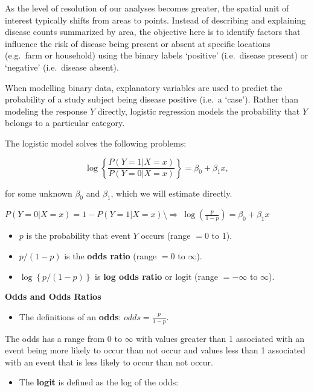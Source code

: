 \documentclass[]{book}
\providecommand{\tightlist}{%
  \setlength{\itemsep}{0pt}\setlength{\parskip}{0pt}}
\begin{document}
As the level of resolution of our analyses becomes greater, the spatial
unit of interest typically shifts from areas to points. Instead of
describing and explaining disease counts summarized by area, the
objective here is to identify factors that influence the risk of disease
being present or absent at specific locations (e.g.~farm or household)
using the binary labels `positive' (i.e.~disease present) or `negative'
(i.e.~disease absent).

When modelling binary data, explanatory variables are used to predict
the probability of a study subject being disease positive (i.e.~a
`case'). Rather than modeling the response \(Y\) directly, logistic
regression models the probability that \(Y\) belongs to a particular
category.

The logistic model solves the following problems:

\[
\log\left\{\frac{P(Y=1|X=x)}{P(Y=0|X=x)}\right\}=\beta_0+\beta_1x,
\]

for some unknown \(\beta_0\) and \(\beta_1\), which we will estimate
directly.

\(P(Y=0|X=x)=1-P(Y=1|X=x)\)\textbackslash{}\(\Rightarrow~\log\left(\frac{p}{1-p}\right)=\beta_0+\beta_1x\)

\begin{itemize}
\tightlist
\item
  \(p\) is the probability that event \(Y\) occurs (range \(=0\) to 1).
\item
  \(p/(1-p)\) is the \textbf{odds ratio} (range \(=0\) to \(\infty\)).
\item
  \(\log\left\{p/(1-p)\right\}\) is \textbf{log odds ratio} or logit
  (range \(=-\infty\) to \(\infty\)).
\end{itemize}

\textbf{Odds and Odds Ratios}

\begin{itemize}
\tightlist
\item
  The definitions of an \textbf{odds}: \(odds=\frac{p}{1-p}\).
\end{itemize}

The odds has a range from 0 to \(\infty\) with values greater than 1
associated with an event being more likely to occur than not occur and
values less than 1 associated with an event that is less likely to occur
than not occur.

\begin{itemize}
\tightlist
\item
  The \textbf{logit} is defined as the log of the odds:
\end{itemize}
\end{document}
